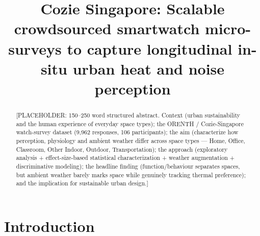 \documentclass[]{interact}
\begin{document}

\title{Cozie Singapore: Scalable crowdsourced smartwatch micro-surveys to capture longitudinal in-situ urban heat and noise perception}

\author{
}

\maketitle

\begin{abstract}
[PLACEHOLDER: 150--250 word structured abstract. Context (urban sustainability
and the human experience of everyday space types); the ORENTH / Cozie-Singapore
watch-survey dataset (9{,}962 responses, 106 participants); the aim (characterize
how perception, physiology and ambient weather differ across space types --- Home,
Office, Classroom, Other Indoor, Outdoor, Transportation); the approach
(exploratory analysis + effect-size-based statistical characterization + weather
augmentation + discriminative modeling); the headline finding (function/behaviour
separates spaces, but ambient weather barely marks space while genuinely tracking
thermal preference); and the implication for sustainable urban design.]
\end{abstract}

\begin{keywords}
\end{keywords}


\section{Introduction}\label{sec:intro}

\end{document}
